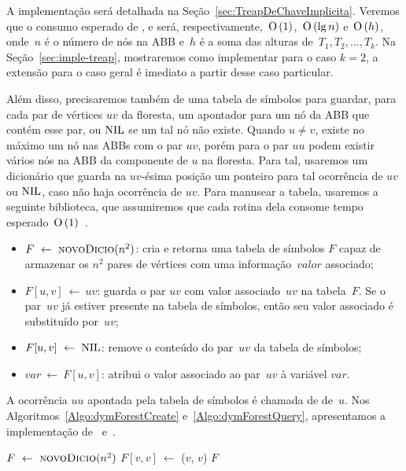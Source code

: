 A implementação será detalhada na Seção~\ref{sec:TreapDeChaveImplicita}. Veremos que o consumo esperado de \treapCreate, \treapGetRoot{} e \treapJoin{} será, respectivamente,~$\text{O}\left(1\right)$,~$\text{O}\left(\lg n\right)$ e~$\text{O}\left(h\right)$, onde~$n$ é o número de nós na ABB e~$h$ é a soma das alturas de~$T_1, T_2, \ldots, T_k$. Na Seção~\ref{sec:imple-treap}, mostraremos como implementar \treapJoin{} para o caso $k=2$, a extensão para o caso geral é imediato a partir desse caso particular.

Além disso, precisaremos também de uma tabela de símbolos para guardar, para cada par de vértices $uv$ da floresta, um apontador para um nó da ABB que contém esse par, ou $\text{NIL}$ se um tal nó não existe. Quando $ u\neq v$, existe no máximo um nó nas ABBs com o par $uv$, porém para o par $uu$ podem existir vários nós na ABB da componente de $u$ na floresta. Para tal, usaremos um dicionário que guarda na $uv$-ésima posição um ponteiro para tal ocorrência de $uv$ ou $\text{NIL}$, caso não haja ocorrência de $uv$. Para manusear a tabela, usaremos a seguinte biblioteca, que assumiremos que cada rotina dela consome tempo esperado~$\text{O}\left(1\right)$~\cite{CLRS}.
\begin{itemize}
    \item $F~\gets~\text{\scshape novoDicio}(n^2)$: cria e retorna uma tabela de símbolos $F$ capaz de armazenar os $n^2$ pares de vértices com uma informação~$valor$ associado;
    \item $F[u,v]~\gets~uv$: guarda o par $uv$ com valor associado~$uv$ na tabela~$F$. Se o par~$uv$ já estiver presente na tabela de símbolos, então seu valor associado é substituído por~$uv$;
    \item $F[u,v]~\gets~\text{NIL}{}$: remove o conteúdo do par~$uv$ da tabela de símbolos;
    \item $var~\gets~F[u,v]$: atribui o valor associado ao par~$uv$ à variável $var$.
\end{itemize}

A ocorrência $uu$ apontada pela tabela de símbolos é chamada de  de~$u$. Nos Algoritmos~\ref{Algo:dymForestCreate} e~\ref{Algo:dymForestQuery}, apresentamos a implementação de~\dymForestCreate{} e~\dymForestQuery. 

\begin{algorithm}[htb]
\caption{\dymForestCreate($n$)}
\label{Algo:dymForestCreate}
\begin{algorithmic}[1]
\State $F~\gets~\text{\scshape novoDicio}(n^2)$
\label{Algo:dymForestCreate:for}
\State $F[v,v]~\gets$ \treapCreate($v$, $v$)
\EndFor
\State \Return $F$
\end{algorithmic}
\end{algorithm}

